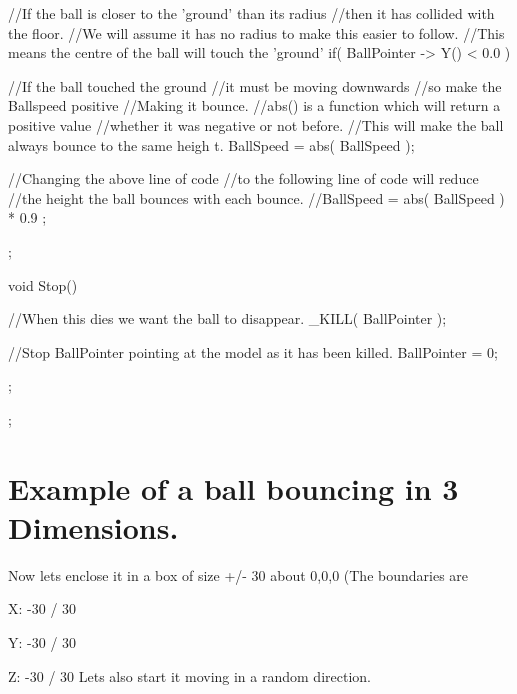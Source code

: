 \begin{DoxyCode}
{{                //If the ball is closer to the 'ground' than its radius
                //then it has collided with the floor.
                //We will assume it has no radius to make this easier to follow.
                //This means the centre of the ball will touch the 'ground'
                if( BallPointer -> Y()  < 0.0 )
                {
                        //If the ball touched the ground
                        //it must be moving downwards
                        //so make the Ballspeed positive
                        //Making it bounce.
                        //abs() is a function which will return a positive value
                        //whether it was negative or not before.
                        //This will make the ball always bounce to the same heigh
      t.
                                BallSpeed = abs( BallSpeed );

                        //Changing the above line of code
                        //to the following line of code will reduce
                        //the height the ball bounces with each bounce.
                        //BallSpeed = abs( BallSpeed ) * 0.9 ;
                }
        };

        void Stop()
        {
                //When this dies we want the ball to disappear.
                        _KILL( BallPointer );

                //Stop BallPointer pointing at the model as it has been killed.
                        BallPointer = 0;
        };
};
\end{DoxyCode}
 \hypertarget{_code_program_examples_ThreeDimensionBouncingBallExample}{}\section{Example of a ball bouncing in 3 Dimensions.}\label{_code_program_examples_ThreeDimensionBouncingBallExample}
Now lets enclose it in a box of size +/-\/ 30 about 0,0,0 (The boundaries are
\begin{DoxyItemize}
\item X: -\/30 / 30
\item Y: -\/30 / 30
\item Z: -\/30 / 30 Lets also start it moving in a random direction.
\end{DoxyItemize}


